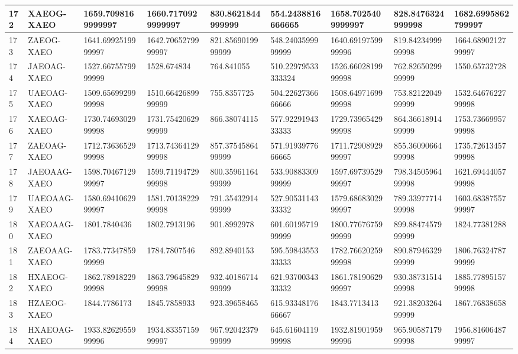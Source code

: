{\begin{longtable}{|l|l|l|l|l|l|l|l|l|}
        172 & XAEOG-XAEO & 1659.7098169999997 & 1660.7170929999997 & 830.8621844999999 & 554.2438816666665 & 1658.7025409999997 & 828.8476324999998 & 1682.6995862799997 \\ \hline
        173 & ZAEOG-XAEO & 1641.6992519999997 & 1642.7065279999997 & 821.8569019999999 & 548.2403599999999 & 1640.6919759999996 & 819.8423499999998 & 1664.6890212799997 \\ \hline
        174 & JAEOAG-XAEO & 1527.6675579999999 & 1528.674834 & 764.841055 & 510.22979533333324 & 1526.6602819999998 & 762.8265029999999 & 1550.65732728 \\ \hline
        175 & UAEOAG-XAEO & 1509.6569929999998 & 1510.6642689999999 & 755.8357725 & 504.2262736666666 & 1508.6497169999998 & 753.8212204999999 & 1532.6467622799998 \\ \hline
        176 & XAEOAG-XAEO & 1730.7469302999998 & 1731.7542062999999 & 866.38074115 & 577.9229194333333 & 1729.7396542999998 & 864.3661891499999 & 1753.7366995799998 \\ \hline
        177 & ZAEOAG-XAEO & 1712.7363652999998 & 1713.7436412999998 & 857.3754586499999 & 571.9193977666665 & 1711.7290892999997 & 855.3609066499998 & 1735.7261345799998 \\ \hline
        178 & JAEOAAG-XAEO & 1598.7046712999997 & 1599.7119472999998 & 800.3596116499999 & 533.9088330999999 & 1597.6973952999997 & 798.3450596499998 & 1621.6944405799998 \\ \hline
        179 & UAEOAAG-XAEO & 1580.6941062999997 & 1581.7013822999998 & 791.3543291499999 & 527.9053114333332 & 1579.6868302999997 & 789.3397771499998 & 1603.6838755799997 \\ \hline
        180 & XAEOAAG-XAEO & 1801.7840436 & 1802.7913196 & 901.8992978 & 601.6019571999999 & 1800.7767675999999 & 899.8847457999999 & 1824.77381288 \\ \hline
        181 & ZAEOAAG-XAEO & 1783.7734785999999 & 1784.7807546 & 892.8940153 & 595.5984355333333 & 1782.7662025999998 & 890.8794632999999 & 1806.7632478799999 \\ \hline
        182 & HXAEOG-XAEO & 1862.7891822999998 & 1863.7964582999998 & 932.4018671499999 & 621.9370034333332 & 1861.7819062999997 & 930.3873151499998 & 1885.7789515799998 \\ \hline
        183 & HZAEOG-XAEO & 1844.7786173 & 1845.7858933 & 923.39658465 & 615.9334817666667 & 1843.7713413 & 921.3820326499999 & 1867.76838658 \\ \hline
        184 & HXAEOAG-XAEO & 1933.8262955999996 & 1934.8335715999997 & 967.9204237999999 & 645.6160411999998 & 1932.8190195999996 & 965.9058717999998 & 1956.8160648799997 \\ \hline

\end{longtable}}
